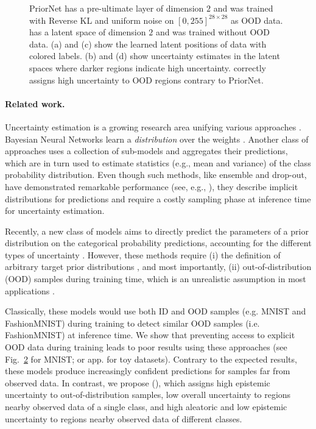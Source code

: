 \begin{figure}[ht!]
\begin{subfigure}[t]{0.23\columnwidth}
        \label{ours_visualization_unc}
    \end{subfigure}%
    \caption{PriorNet has a pre-ultimate layer of dimension $2$ and was trained with Reverse KL and uniform noise on $[0,255]^{28\times28}$ as OOD data. \PostNetacro has a latent space of dimension $2$ and was trained without OOD data. (a) and (c) show the learned latent positions of data with colored labels. (b) and (d) show uncertainty estimates in the latent spaces where darker regions indicate high uncertainty. \PostNetacro correctly assigns high uncertainty to OOD regions contrary to PriorNet.}
    \label{fig:mnist_2D_latent_space}
\end{figure}

\paragraph{Related work.} Uncertainty estimation is a growing research area unifying various approaches \cite{bayesian-networks, simple-baseline-uncertainty, practical_deep_bayesian_principles, Eswaran2017, ensembles, dropout}. Bayesian Neural Networks learn a \emph{distribution} over the weights \cite{bayesian-networks, simple-baseline-uncertainty, practical_deep_bayesian_principles}. Another class of approaches uses a collection of sub-models and aggregates their predictions, which are in turn used to estimate statistics (e.g., mean and variance) of the class probability distribution. Even though such methods, like ensemble and drop-out, have demonstrated remarkable performance (see, e.g., \cite{dataset-shift}), they describe implicit distributions for predictions and require a costly sampling phase at inference time for uncertainty estimation. 

Recently, a new class of models aims to directly predict the parameters of a prior distribution on the categorical probability predictions, accounting for the different types of uncertainty \cite{PriorNetworks, reverse-kl, sensoy2018, uceloss}. However, these methods require (i) the definition of arbitrary target prior distributions \cite{PriorNetworks, reverse-kl, sensoy2018}, and most importantly, (ii) out-of-distribution (OOD) samples during training time, which is an unrealistic assumption in most applications \cite{PriorNetworks, reverse-kl}.

Classically, these models would use both ID and OOD samples (e.g. MNIST and FashionMNIST) during training to detect similar OOD samples (i.e. FashionMNIST) at inference time. We show that preventing access to explicit OOD data during training leads to poor results using these approaches (see Fig.~\ref{fig:mnist_2D_latent_space} for MNIST; or app. for toy datasets). Contrary to the expected results, these models produce increasingly confident predictions for samples far from observed data. In contrast, we propose \PostNet (\PostNetacro), which assigns high epistemic uncertainty to out-of-distribution samples, low overall uncertainty to regions nearby observed data of a single class, and high aleatoric and low epistemic uncertainty to regions nearby observed data of different classes.

